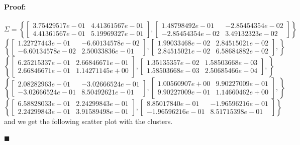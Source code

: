 \documentclass[12pt]{article}
\newenvironment{proof}{\paragraph{Proof: }}{\hfill$\blacksquare$}
\begin{document}
\begin{proof}
\begin{enumerate}
 $\Sigma = \left\{ \left[ \begin{matrix} 3.75429517e-01 & 4.41361567e-01 \\ 4.41361567e-01 & 5.19969327e-01 \end{matrix} \right], \left[ \begin{matrix} 1.48798492e-01 & -2.85454354e-02 \\ -2.85454354e-02 & 3.49132323e-02\end{matrix} \right] \right\}$ $\left\{ \left[ \begin{matrix} 1.22727443e-01 & -6.60134578e-02 \\ -6.60134578e-02 & 2.50033836e-01 \end{matrix} \right],\left[ \begin{matrix} 1.99033468e-02 & 2.84515021e-02 \\ 2.84515021e-02 & 6.58684882e-02 \end{matrix} \right], \right\}$ $\left\{ \left[ \begin{matrix} 6.25215337e-01 & 2.66846671e-01 \\ 2.66846671e-01 & 1.14271145e+00 \end{matrix} \right], \left[ \begin{matrix} 1.35135357e-02 & 1.58503668e-03 \\ 1.58503668e-03 & 2.50685466e-04 \end{matrix} \right],\right\}$ $\left\{\left[ \begin{matrix} 2.08282963e-01 & -3.02666524e-01 \\ -3.02666524e-01 & 8.50492621e-01\end{matrix} \right],\left[ \begin{matrix} 1.00560907e+00 & 9.90227009e-01 \\ 9.90227009e-01 & 1.14660462e+00\end{matrix} \right],\right\}$ $\left\{\left[ \begin{matrix} 6.58828033e-01 & 2.24299843e-01 \\ 2.24299843e-01 & 3.91589498e-01 \end{matrix} \right],\left[ \begin{matrix} 8.85017840e-01 & -1.96596216e-01 \\ -1.96596216e-01 & 8.51715398e-01 \end{matrix} \right] \right\}$ and we get the following scatter plot with the clusters.\\



\end{enumerate}
\end{proof}
\end{document}
